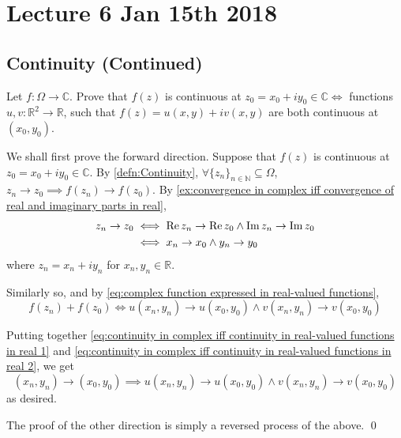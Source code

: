 \documentclass[notoc,notitlepage]{tufte-book}
\begin{document}

\chapter{Lecture 6 Jan 15th 2018}
	\label{chapter:lecture_6_jan_15th_2018}

\section{Continuity (Continued)} %
\label{sec:continuity}

\begin{ex}\label{ex:continuity in complex iff continuity in real-valued functions in real}
	Let $f: \Omega \to \mathbb{C}$. Prove that $f(z)$ is continuous at $z_0 = x_0 + iy_0 \in \mathbb{C} \iff$ functions $u, v: \mathbb{R}^2 \to \mathbb{R}$, such that $f(z) = u(x, y) + iv(x,y)$ are both continuous at $(x_0, y_0)$.

	\begin{solution}
		We shall first prove the forward direction. Suppose that $f(z)$ is continuous at $z_0 = x_0 + iy_0 \in \mathbb{C}$. By \cref{defn:Continuity}, $\forall \{z_n\}_{n \in \mathbb{N}} \subseteq \Omega$, $z_n \to z_0 \implies f(z_n) \to f(z_0)$. By \cref{ex:convergence in complex iff convergence of real and imaginary parts in real},
		\begin{align}
			z_n \to z_0 &\iff \operatorname{Re} z_n \to \operatorname{Re} z_0 \land \operatorname{Im} z_n \to \operatorname{Im} z_0 \nonumber \\
				&\iff x_n \to x_0 \land y_n \to y_0 \label{eq:continuity in complex iff continuity in real-valued functions in real 1}
		\end{align}
		where $z_n = x_n + iy_n$ for $x_n, y_n \in \mathbb{R}$.

		Similarly so, and by \cref{eq:complex function expressed in real-valued functions},
		\begin{equation}\label{eq:continuity in complex iff continuity in real-valued functions in real 2}
			f(z_n) + f(z_0) \iff u(x_n, y_n) \to u(x_0, y_0) \land v(x_n, y_n) \to v(x_0, y_0)
		\end{equation}

		Putting together \cref{eq:continuity in complex iff continuity in real-valued functions in real 1} and \cref{eq:continuity in complex iff continuity in real-valued functions in real 2}, we get
		\begin{equation*}
			(x_n, y_n) \to (x_0, y_0) \implies u(x_n, y_n) \to u(x_0, y_0) \land v(x_n, y_n) \to v(x_0, y_0)
		\end{equation*}
		as desired.

		The proof of the other direction is simply a reversed process of the above. \qed
	\end{solution}
\end{ex}
\end{document}
